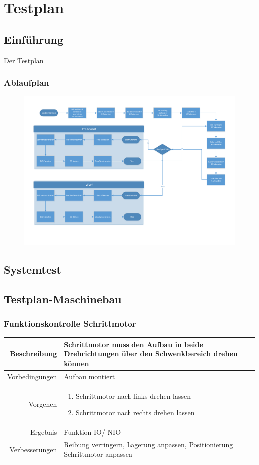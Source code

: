 \section{Testplan}

\subsection{Einführung}

Der Testplan

\subsubsection{Ablaufplan}
\begin{figure}
	\centering
	\includegraphics[width=0.7\linewidth]{../../fig/ablauf-ballwurf}
	\caption{}
	\label{fig:ablauf-ballwurf}
\end{figure}

\subsection{Systemtest}

\subsection{Testplan-Maschinebau}
\subsubsection{Funktionskontrolle Schrittmotor}
\begin{table}[h!]
	\renewcommand{\arraystretch}{1.5}
	\begin{tabular}{|r|p{14cm}|}
		\hline Beschreibung & Schrittmotor muss den Aufbau in beide Drehrichtungen über den Schwenkbereich drehen können  \\ 
		\hline Vorbedingungen & Aufbau montiert \\ 
		\hline Vorgehen & 
		\begin{enumerate}
			\item Schrittmotor nach links drehen lassen 
			\item Schrittmotor nach rechts drehen lassen
		\end{enumerate} \\ 
		\hline Ergebnis & Funktion IO/ NIO \\ 
		\hline Verbesserungen & Reibung verringern, Lagerung anpassen, Positionierung Schrittmotor anpassen \\ 
		\hline 
	\end{tabular}
\end{table}

